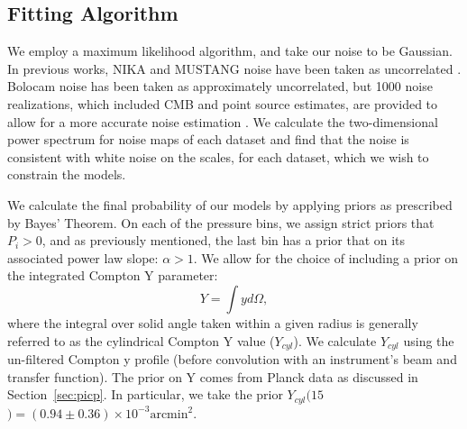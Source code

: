 \documentclass[twocolumn,traditabstract]{aa}
\begin{document}

\subsection{Fitting Algorithm}
\label{sec:fitting}

We employ a maximum likelihood algorithm, and take our noise to be Gaussian.
In previous works, NIKA and MUSTANG noise have been taken as uncorrelated \citep[e.g.][]{romero2015a,romero2017,adam2015}.
Bolocam noise has been taken as approximately uncorrelated, but 1000 noise realizations, which included CMB and point
source estimates, are provided to allow for a more accurate noise estimation \citep{sayers2011}.
We calculate the two-dimensional power spectrum for noise maps of each dataset and find that the noise is consistent
with white noise on the scales, for each dataset, which we wish to constrain the models.

We calculate the final probability of our models by applying priors as prescribed by Bayes' Theorem.
On each of the pressure bins, we assign strict priors that $P_i > 0$, and as previously mentioned, the last bin
has a prior that on its associated power law slope: $\alpha > 1$. We allow for the choice of including a prior
on the integrated Compton Y parameter:
\begin{equation}
  Y = \int y d\Omega,
  \label{eqn:integrated_y}
\end{equation}
where the integral over solid angle taken within a given radius is generally referred to as the cylindrical
Compton Y value ($Y_{cyl}$). We calculate $Y_{cyl}$ using the un-filtered Compton y profile (before convolution with
an instrument's beam and transfer function). The prior on Y comes
from Planck data \citep{planck2014} as discussed in Section~\ref{sec:picp}.
In particular, we take the prior $Y_{cyl}(15$\amin$) = (0.94 \pm 0.36) \times 10^{-3} \text{arcmin}^2$.
\end{document}

